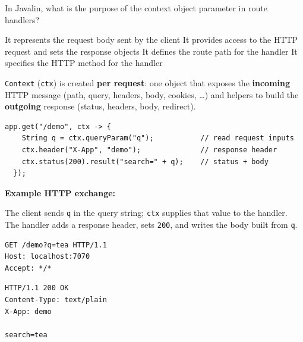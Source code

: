 \question[4]
In Javalin, what is the purpose of the context object parameter in route handlers?
\begin{choices}
  \choice It represents the request body sent by the client
  \CorrectChoice It provides access to the HTTP request and sets the response objects
  \choice It defines the route path for the handler
  \choice It specifies the HTTP method for the handler
\end{choices}
\begin{solution}
  \texttt{Context} (\texttt{ctx}) is created \textbf{per request}: one object that exposes the \textbf{incoming} HTTP message (path, query, headers, body, cookies, \ldots) and helpers to build the \textbf{outgoing} response (status, headers, body, redirect).

  \begin{lstlisting}[style=java]
  app.get("/demo", ctx -> {
    String q = ctx.queryParam("q");           // read request inputs
    ctx.header("X-App", "demo");              // response header
    ctx.status(200).result("search=" + q);    // status + body
  });
  \end{lstlisting}

  \noindent\textbf{Example HTTP exchange:}\par
  \noindent The client sends \texttt{q} in the query string; \texttt{ctx} supplies that value to the handler. The handler adds a response header, sets \texttt{200}, and writes the body built from \texttt{q}.\par
  \begin{httpexchange}
\begin{lstlisting}[style=http]
GET /demo?q=tea HTTP/1.1
Host: localhost:7070
Accept: */*

\end{lstlisting}
\httpmidarrows
\begin{lstlisting}[style=http]
HTTP/1.1 200 OK
Content-Type: text/plain
X-App: demo

search=tea
\end{lstlisting}
  \end{httpexchange}
\end{solution}

\newpage

